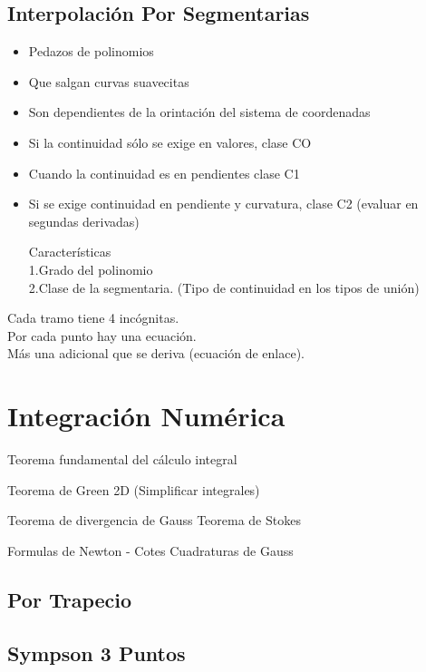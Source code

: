 \subsection{Interpolaci\'on Por Segmentarias}
\begin{itemize}
\item Pedazos de polinomios
\item Que salgan curvas suavecitas
\item Son dependientes de la orintaci\'on del sistema de coordenadas

\item Si la continuidad s\'olo se exige en valores, clase CO
\item Cuando la continuidad es en pendientes clase C1

\item Si se exige continuidad en pendiente y curvatura, clase C2 (evaluar en segundas derivadas)

Caracter\'isticas\\
1.Grado del polinomio\\
2.Clase de la segmentaria. (Tipo de continuidad en los tipos de uni\'on)
\end{itemize}

Cada tramo tiene 4 inc\'ognitas.\\
Por cada punto hay una ecuaci\'on.\\
M\'as una adicional que se deriva (ecuaci\'on de enlace).

\section{Integraci\'on Num\'erica}

Teorema fundamental del c\'alculo integral

Teorema de Green 2D (Simplificar integrales)

Teorema de divergencia de Gauss
Teorema de Stokes


Formulas de Newton - Cotes
Cuadraturas de Gauss

\subsection{Por Trapecio}

\subsection{Sympson 3 Puntos}

